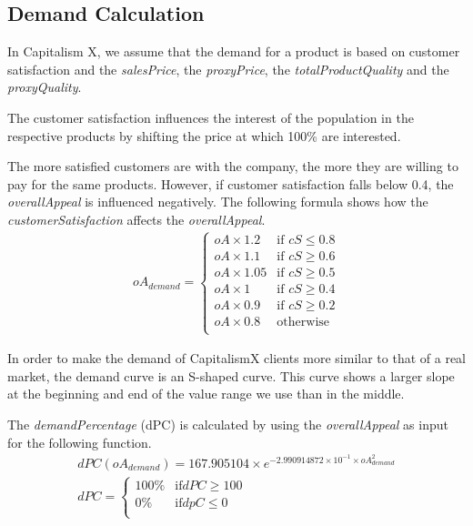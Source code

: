 \subsection{Demand Calculation} \label{demandCalc}

In Capitalism X, we assume that the demand for a product is based on customer satisfaction and the \textit{salesPrice}, the \textit{proxyPrice}, the \textit{totalProductQuality} and the \textit{proxyQuality}.

The customer satisfaction influences the interest of the population in the respective products by shifting the price at which 100\% are interested.
 
The more satisfied customers are with the company, the more they are willing to pay for the same products. However, if customer satisfaction falls below 0.4, the \textit{overallAppeal} is influenced negatively. The following formula shows how the \textit{customerSatisfaction} affects the \textit{overallAppeal}.
\begin{equation}
\label{func:demandPrice}
\begin{aligned}
 oA_{demand} = 
\begin{cases}
    oA \times 1.2 & \text{if } cS \leq 0.8 \\
    oA \times 1.1 & \text{if } cS \geq 0.6 \\
    oA \times 1.05 & \text{if } cS \geq 0.5 \\
    oA \times 1 & \text{if } cS \geq 0.4 \\
    oA \times 0.9 & \text{if } cS \geq 0.2 \\
    oA \times 0.8 & \text{otherwise} \\
\end{cases}
\end{aligned}
\end{equation}

In order to make the demand of CapitalismX clients more similar to that of a real market, the demand curve is an S-shaped curve. This curve shows a larger slope at the beginning and end of the value range we use than in the middle.

The \textit{demandPercentage} (\gls{dPC}) is calculated by using the \textit{overallAppeal} as input for the following function. 
\begin{equation}
\label{func:demandPercentage}
\begin{aligned}
dPC(oA_{demand}) = 167.905104 \times e^{−2.990914872 \times 10^{ -1 } \times oA_{demand}^{ 2 } } \\
dPC = 
    \begin{cases}
        100\% & \text{if} dPC \geq 100\\
        0\% & \text{if} dpC \leq 0\\
    \end{cases}
\end{aligned}
\end{equation}

